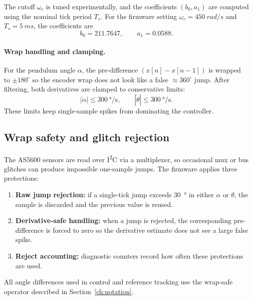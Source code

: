 The cutoff $\omega_c$ is tuned experimentally, and the coefficients $(b_0,a_1)$ are computed using the nominal tick period $T_s$. For the firmware setting $\omega_c=\SI{450}{rad/s}$ and $T_s=\SI{5}{ms}$, the coefficients are
\[
b_0 = 211.7647,\qquad a_1 = 0.0588.
\]

\paragraph{Wrap handling and clamping.}
For the pendulum angle $\alpha$, the pre-difference $(x[n]-x[n-1])$ is wrapped to $\pm 180^\circ$ so the encoder wrap does not look like a false $\approx 360^\circ$ jump. After filtering, both derivatives are clamped to conservative limits:
\[
|\dot{\alpha}| \le \SI{300}{\degree\per\second},\qquad
|\dot{\theta}| \le \SI{300}{\degree\per\second}.
\]
These limits keep single-sample spikes from dominating the controller.

\subsection{Wrap safety and glitch rejection}
\label{sec:measurement_glitch_rejection}
The AS5600 sensors are read over I\textsuperscript{2}C via a multiplexer, so occasional mux or bus glitches can produce impossible one-sample jumps. The firmware applies three protections:
\begin{enumerate}
  \item \textbf{Raw jump rejection:} if a single-tick jump exceeds \SI{30}{\degree} in either $\alpha$ or $\theta$, the sample is discarded and the previous value is reused.
  \item \textbf{Derivative-safe handling:} when a jump is rejected, the corresponding pre-difference is forced to zero so the derivative estimate does not see a large false spike.
  \item \textbf{Reject accounting:} diagnostic counters record how often these protections are used.
\end{enumerate}

All angle differences used in control and reference tracking use the wrap-safe operator described in Section~\ref{ch:notation}.

